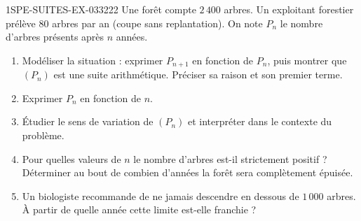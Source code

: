 \begin{exercice}{1SPE-SUITES-EX-033}{2}{22}
Une forêt compte $2\,400$ arbres. Un exploitant forestier prélève $80$ arbres par an (coupe sans replantation). On note $P_n$ le nombre d'arbres présents après $n$ années.

\begin{enumerate}
  \item Modéliser la situation : exprimer $P_{n+1}$ en fonction de $P_n$, puis montrer que $(P_n)$ est une suite arithmétique. Préciser sa raison et son premier terme.

  \item Exprimer $P_n$ en fonction de $n$.

  \item Étudier le sens de variation de $(P_n)$ et interpréter dans le contexte du problème.

  \item Pour quelles valeurs de $n$ le nombre d'arbres est-il strictement positif ? Déterminer au bout de combien d'années la forêt sera complètement épuisée.

  \item Un biologiste recommande de ne jamais descendre en dessous de $1\,000$ arbres. À partir de quelle année cette limite est-elle franchie ?
\end{enumerate}
\end{exercice}
